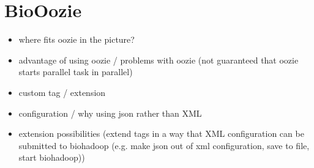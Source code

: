   
  
\section{BioOozie}
\label{chap:impl:oozie}
  \begin{itemize}
    \item where fits oozie in the picture?
    \item advantage of using oozie / problems with oozie (not guaranteed that oozie starts parallel task in parallel)
    \item custom tag / extension
    \item configuration / why using json rather than XML
    \item extension possibilities (extend tags in a way that XML configuration can be submitted to biohadoop (e.g. make json out of xml configuration, save to file, start biohadoop))
  \end{itemize}